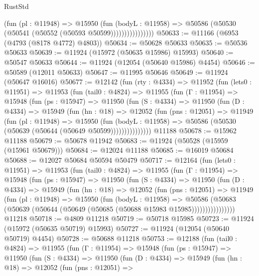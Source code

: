 \begin{lexlean}{RustStd}
\begin{coremodule}
{\begin{coremodule}
{{{{{{{{{{{{{{{{{{{{{{{{{{{{{{{{{{{{{{{{{{{{{{{{{{{{{{{{{{{{{{{{{{{{{{{{{{{{{{{{                        (fun (pl : @11948) =>
                        @15950
                          (fun (bodyL : @11958) =>
                          @50586 (@50530 (@50541 (@50552 (@50593 @50599))))))))))))))))
@50633 := @11166 (@6953 (@4793 (@8178 @4772) @4803))
@50634 := @50628 @50633
@50635 := @50536 @50633
@50639 := @11924 (@15972 (@50635 @15986) @15993)
@50640 := @50547 @50633
@50644 := @11924 (@12054 (@50640 @15986) @4454)
@50646 := @50589 (@12011 @50633)
@50647 := @11995 @50646
@50649 := @11924 (@50647 @16016)
@50677 := @12142
    (fun (rty : @4334) =>
    @11952
      (fun (lets0 : @11951) =>
      @11953
        (fun (tail0 : @4824) =>
        @11955
          (fun (Γ : @11954) =>
          @15948
            (fun (ps : @15947) =>
            @11950
              (fun (S : @4334) =>
              @11950
                (fun (D : @4334) =>
                @15949
                  (fun (hn : @18) =>
                  @12052
                    (fun (pns : @12051) =>
                    @11949
                      (fun (pl : @11948) =>
                      @15950
                        (fun (bodyL : @11958) =>
                        @50586 (@50530 (@50639 (@50644 (@50649 @50599)))))))))))))))
    @11188
@50678 := @15962 @11188
@50679 := @50678 @11942
@50683 := @11924 (@50528 (@15959 (@15961 @50679)))
@50684 := @12024 @11188
@50685 := @16019 @50684
@50688 := @12027 @50684 @50594 @50479
@50717 := @12164
    (fun (lets0 : @11951) =>
    @11953
      (fun (tail0 : @4824) =>
      @11955
        (fun (Γ : @11954) =>
        @15948
          (fun (ps : @15947) =>
          @11950
            (fun (S : @4334) =>
            @11950
              (fun (D : @4334) =>
              @15949
                (fun (hn : @18) =>
                @12052
                  (fun (pns : @12051) =>
                  @11949
                    (fun (pl : @11948) =>
                    @15950
                      (fun (bodyL : @11958) =>
                      @50586
                        (@50683
                          (@50639 (@50644 (@50649 (@50685 (@50688 @15983 @15985))))))))))))))))
    @11218
@50718 := @4809 @11218
@50719 := @50718 @15985
@50723 := @11924 (@15972 (@50635 @50719) @15993)
@50727 := @11924 (@12054 (@50640 @50719) @4454)
@50728 := @50688 @11218
@50753 := @12188
    (fun (tail0 : @4824) =>
    @11955
      (fun (Γ : @11954) =>
      @15948
        (fun (ps : @15947) =>
        @11950
          (fun (S : @4334) =>
          @11950
            (fun (D : @4334) =>
            @15949
              (fun (hn : @18) =>
              @12052
                (fun (pns : @12051) =>
}}}}}}}}}}}}}}}}}}}}}}}}}}}}}}}}}}}}}}}}}}}}}}}}}}}}}}}}}}}}}}}}}}}}}}}}}}}}}}}}
\end{coremodule}}
\end{coremodule}
\end{lexlean}
